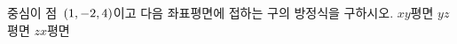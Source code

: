 중심이 점~$(1{,}\mkern3mu\mathopen{}-2{,}\mkern3mu\mathopen{}4)$이고 다음 좌표평면에 접하는 구의 방정식을 구하시오.
 $xy$평면
 $yz$평면
 $zx$평면

